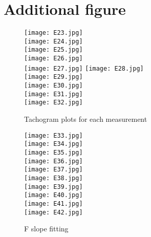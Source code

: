\section{Additional figure}








\begin{figure}[!htbp]
%
\centering
\texttt{[image: E23.jpg]}\\
\texttt{[image: E24.jpg]}\\
\texttt{[image: E25.jpg]}\\
\texttt{[image: E26.jpg]}\\
\texttt{[image: E27.jpg]}
\endminipage\hfill
{}%
\centering
\texttt{[image: E28.jpg]}\\
\texttt{[image: E29.jpg]}\\
\texttt{[image: E30.jpg]}\\
\texttt{[image: E31.jpg]}\\
\texttt{[image: E32.jpg]}
\endminipage\hfill
\caption{Tachogram plots for each measurement}
\end{figure}




\begin{figure}[!htbp]
%
\centering
\texttt{[image: E33.jpg]}\\
\texttt{[image: E34.jpg]}\\
\texttt{[image: E35.jpg]}\\
\texttt{[image: E36.jpg]}\\
\texttt{[image: E37.jpg]}\\
\subcaption{}
\endminipage\hfill
{}%
\centering
\texttt{[image: E38.jpg]}\\
\texttt{[image: E39.jpg]}\\
\texttt{[image: E40.jpg]}\\
\texttt{[image: E41.jpg]}\\
\texttt{[image: E42.jpg]}\\
\subcaption{}
\endminipage\hfill
\caption{F slope fitting}
\end{figure}


